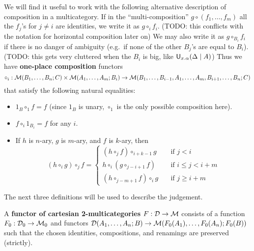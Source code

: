 %
We will find it useful to work with the following alternative description of composition in a multicategory.
If in the ``multi-composition'' $g\circ (f_1,\dots,f_m)$ all the $f_j$'s for $j\neq i$ are identities, we write it as $g \circ_i f_i$. (TODO: this conflicts with the notation for horizontal composition later on)
We may also write it as $g\circ_{B_i} f_i$ if there is no danger of ambiguity (e.g.\ if none of the other $B_j$'s are equal to $B_i$). (TODO: this gets very cluttered when the $B_i$ is big, like $\mathsf{U}_{x.\alpha}(\Delta \mid A)$)
Thus we have \textbf{one-place composition} functors
\[
  \circ_i : \mathcal{M}(B_1,\dots,B_n;C) \times \mathcal{M}(A_1,\dots,A_m;B_i) \\
  \to \mathcal{M}(B_1,\dots,B_{i-1},A_1,\dots,A_m,B_{i+1},\dots,B_n;C)
\]
that satisfy the following natural equalities:
\begin{itemize}
\item $1_B \circ_1 f = f$ (since $1_B$ is unary, $\circ_1$ is the only possible composition here).
\item $f\circ_i 1_{B_i} = f$ for any $i$.
\item If $h$ is $n$-ary, $g$ is $m$-ary, and $f$ is $k$-ary, then
  \[ (h \circ_i g) \circ_{j} f=
  \begin{cases}
    (h\circ_j f)\circ_{i+k-1} g &\quad \text{if } j < i\\
    h\circ_i (g\circ_{j-i+1} f) &\quad \text{if } i \le j < i+m\\
    (h\circ_{j-m+1} f)\circ_{i} g &\quad \text{if } j \ge i+m
  \end{cases}
  \]
\end{itemize}



The next three definitions will be used to describe the
 judgement.  

\begin{definition}
  A \textbf{functor of cartesian 2-multicategories} $F:\mathcal{D}\to\mathcal{M}$ consists
  of a function $F_0 : \mathcal{D}_0 \to \mathcal{M}_0$ and functors $\mathcal{D}(A_1,\ldots,A_n;B)
  \to \mathcal{M}(F_0(A_1),\ldots,F_0(A_n);F_0(B))$ such that the chosen
  identities, compositions, and renamings are preserved (strictly).
\end{definition}

